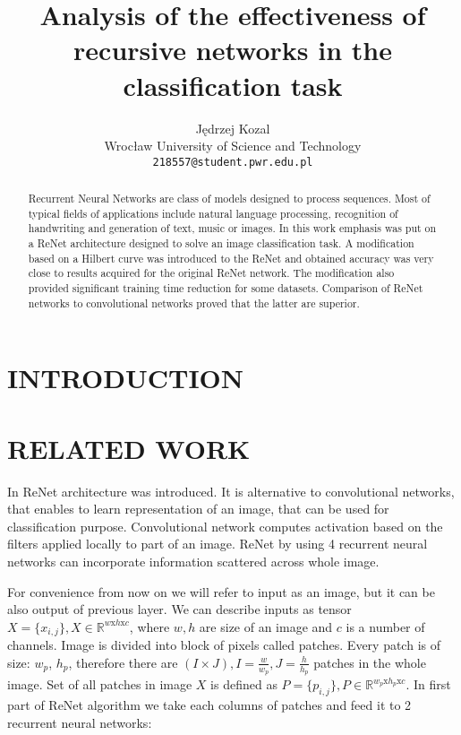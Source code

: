 \documentclass[a4paper, 10 pt, conference]{ieeeconf}
\title{\LARGE \bf
Analysis of the effectiveness of recursive
networks in the classification task
}
\author{\parbox{2 in}{\centering Jędrzej Kozal \\
        Wrocław University of Science and Technology\\
        {\tt\small 218557@student.pwr.edu.pl}}
}
\begin{document}
\maketitle
\thispagestyle{empty}
\pagestyle{empty}

\begin{abstract}

Recurrent Neural Networks are class of models designed to process sequences. Most of typical fields of applications include natural language processing, recognition of handwriting and generation of text, music or images. In this work emphasis was put on a ReNet architecture designed to solve an image classification task. A modification based on a Hilbert curve was introduced to the ReNet and obtained accuracy was very close to results acquired for the original ReNet network. The modification also provided significant training time reduction for some datasets. Comparison of ReNet networks to convolutional networks proved that the latter are superior.

\end{abstract}


\section{INTRODUCTION}

\cite{Goodfellow-et-al-2016}

 

\section{RELATED WORK}

In \cite{DBLP:journals/corr/VisinKCMCB15} ReNet architecture was introduced. It is alternative to convolutional networks, that enables to learn representation of an image, that can be used for classification purpose. Convolutional network computes activation based on the filters applied locally to part of an image. ReNet by using 4 recurrent neural networks can incorporate information scattered across whole image.

For convenience from now on we will refer to input as an image, but it can be also output of previous layer. We can describe inputs as tensor $X = \{x_{i,j}\}, X \in \mathbb{R}^{w \textrm{x} h \textrm{x} c}$, where $w, h$ are size of an image and $c$ is a number of channels. Image is divided into block of pixels called patches. Every patch is of size: $w_p$, $h_p$, therefore there are $(I \times J),I=\frac{w}{w_p}, J=\frac{h}{h_p}$ patches in the whole image. Set of all patches in image $X$ is defined as $P = \{p_{i,j}\}, P \in \mathbb{R}^{w_p \textrm{x} h_p \textrm{x} c}$. In first part of ReNet algorithm we take each columns of patches and feed it to 2 recurrent neural networks: 
\end{document}
